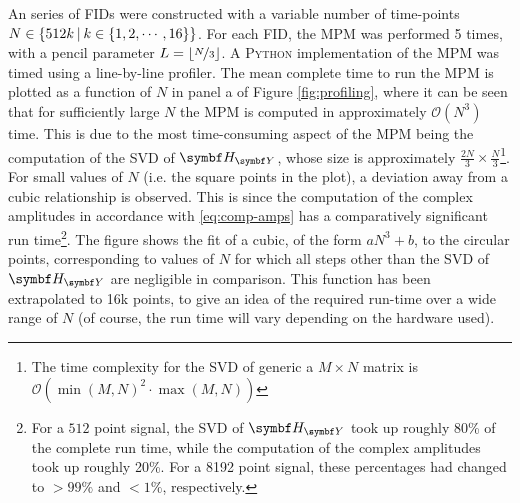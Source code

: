 An series of \acp{FID} were constructed with a variable number of time-points
$N \in \lbrace 512k \hspace*{2pt} \vert \hspace*{2pt} k \in \lbrace 1, 2,
\cdots, 16 \rbrace \rbrace$. For each \ac{FID}, the \ac{MPM} was performed 5
times, with a pencil parameter $L = \lfloor \nicefrac{N}{3} \rfloor$.
A \textsc{Python} implementation of the \ac{MPM} was timed using a line-by-line
profiler. The mean complete time to run the \ac{MPM} is plotted as a function
of $N$ in panel a of Figure \ref{fig:profiling}, where it can be seen that for
sufficiently large $N$ the \ac{MPM} is computed in approximately
$\mathcal{O}({N}^3)$ time. This is due to the most time-consuming aspect of the
\ac{MPM} being the computation of the \ac{SVD} of $\HY$, whose size is
approximately $\tfrac{2N}{3} \times \tfrac{N}{3}$\footnote{
    The time complexity for the \ac{SVD} of generic a $M \times N$ matrix is
    $\mathcal{O}(\operatorname{min}(M, N)^2 \cdot \operatorname{max}(M, N))$
}. For small values of $N$ (i.e. the square points in the plot), a deviation
away from a cubic relationship is observed. This is since the computation of
the complex amplitudes in accordance with \eqref{eq:comp-amps} has a comparatively significant run time\footnote{
    For a $512$ point signal, the \ac{SVD} of $\HY$ took up roughly 80\% of the
    complete run time, while the computation of the complex amplitudes took up
    roughly 20\%. For a 8192 point signal, these percentages had changed to
    $>\!99\%$ and $<\!1\%$, respectively.
}. The figure shows the fit of a cubic, of the form $aN^3 + b$, to the
circular points, corresponding to values of $N$ for which all steps other than
the \ac{SVD} of $\HY$ are negligible in comparison. This function has been
extrapolated to 16k points, to give an idea of the required run-time over a
wide range of $N$ (of course, the run time will vary depending on the hardware
used).


